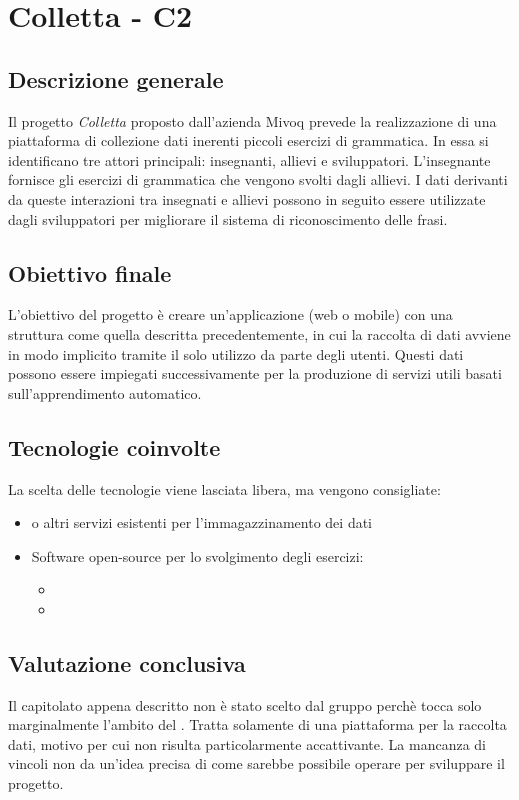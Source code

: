 \section{Colletta - C2} \label{c2}
    \subsection{Descrizione generale}
    Il progetto \textit{Colletta} proposto dall'azienda Mivoq prevede la realizzazione di una piattaforma di collezione dati inerenti piccoli esercizi di grammatica.
    In essa si identificano tre attori principali: insegnanti, allievi e sviluppatori. L'insegnante fornisce gli esercizi di grammatica che vengono svolti dagli allievi.
    I dati derivanti da queste interazioni tra insegnati e allievi possono in seguito essere utilizzate dagli sviluppatori per migliorare il sistema di riconoscimento delle frasi.

    \subsection{Obiettivo finale}
    L'obiettivo del progetto è creare un'applicazione (web o mobile) con una struttura come quella descritta precedentemente,
    in cui la raccolta di dati avviene in modo implicito tramite il solo utilizzo da parte degli utenti. Questi dati possono essere impiegati successivamente per la produzione di
    servizi utili basati sull'apprendimento automatico.

    \subsection{Tecnologie coinvolte}
    La scelta delle tecnologie viene lasciata libera, ma vengono consigliate:
        \begin{itemize}
            \item {} o altri servizi esistenti per l'immagazzinamento dei dati
            \item Software open-source per lo svolgimento degli esercizi:
            \begin{itemize}
                \item {} 
                \item {}
            \end{itemize}
        \end{itemize}

    \subsection{Valutazione conclusiva}
    Il capitolato appena descritto non è stato scelto dal gruppo perchè tocca solo marginalmente l'ambito del .
    Tratta solamente di una piattaforma per la raccolta dati, motivo per cui non risulta particolarmente accattivante.
    La mancanza di vincoli non da un'idea precisa di come sarebbe possibile operare per sviluppare il progetto.

